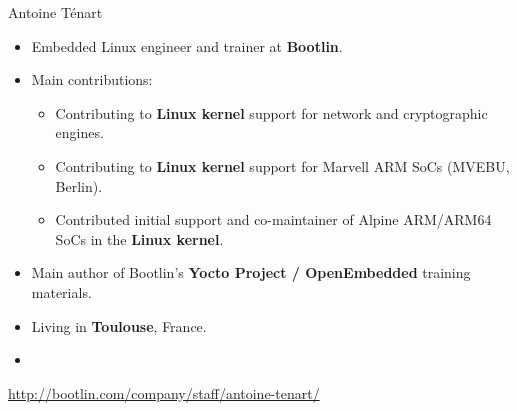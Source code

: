 \begin{frame}{Antoine Ténart}
  \begin{itemize}
    \item Embedded Linux engineer and trainer at {\bf Bootlin}.
    \item Main contributions:
    \begin{itemize}
      \item Contributing to {\bf Linux kernel} support for network and
        cryptographic engines.
      \item Contributing to {\bf Linux kernel} support for Marvell ARM
        SoCs (MVEBU, Berlin).
      \item Contributed initial support and co-maintainer of Alpine
        ARM/ARM64 SoCs in the {\bf Linux kernel}.
    \end{itemize}
    \item Main author of Bootlin's {\bf Yocto Project / OpenEmbedded}
      training materials.
    \item Living in {\bf Toulouse}, France.
    \item {}
  \end{itemize}
  {\small \url{http://bootlin.com/company/staff/antoine-tenart/}}
\end{frame}
